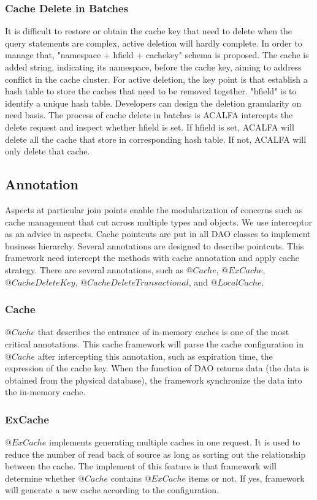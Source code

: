 \documentclass{singlecol-new}
\theoremstyle{TH}{
\newtheorem{lemma}{Lemma}
\newtheorem{theorem}[lemma]{Theorem}
\newtheorem{corrolary}[lemma]{Corrolary}
\newtheorem{conjecture}[lemma]{Conjecture}
\newtheorem{proposition}[lemma]{Proposition}
\newtheorem{claim}[lemma]{Claim}
\newtheorem{stheorem}[lemma]{Wrong Theorem}
}
\theoremstyle{THrm}{
\newtheorem{definition}{Definition}[section]
\newtheorem{question}{Question}[section]
\newtheorem{remark}{Remark}
\newtheorem{scheme}{Scheme}
}
\theoremstyle{THhit}{
\newtheorem{case}{Case}[section]
}
\begin{document}
\subsubsection{Cache Delete in Batches}
It is difficult to restore or obtain the cache key that need to delete when the query statements are complex, active deletion will hardly complete. In order to manage that, "namespace + hfield + cachekey" schema is proposed. The cache is added string, indicating its namespace, before the cache key, aiming to address conflict in the cache cluster. For active deletion, the key point is that establish a hash table to store the caches that need to be removed together. "hfield" is to identify a unique hash table. Developers can design the deletion granularity on need basis. The process of cache delete in batches is ACALFA intercepts the delete request and inspect whether hfield is set. If hfield is set, ACALFA will delete all the cache that store in corresponding hash table. If not, ACALFA will only delete that cache.

\subsection{Annotation}
Aspects at particular join points enable the modularization of concerns such as cache management that cut across multiple types and objects. We use interceptor as an advice in aspects. Cache pointcuts are put in all DAO classes to implement business hierarchy. Several annotations are designed to describe pointcuts. This framework need intercept the methods with cache annotation and apply cache strategy. There are several annotations, such as $@Cache$, $@ExCache$, $@CacheDeleteKey$, $@CacheDeleteTransactional$, and $@LocalCache$.

\subsubsection{Cache}
$@Cache$ that describes the entrance of in-memory caches is one of the most critical annotations. This cache framework will parse the cache configuration in $@Cache$ after intercepting this annotation, such as expiration time, the expression of the cache key. When the function of DAO returns data (the data is obtained from the physical database), the framework synchronize the data into the in-memory cache.

\subsubsection{ExCache}
$@ExCache$ implements generating multiple caches in one request. It is used to reduce the number of read back of source as long as sorting out the relationship between the cache. The implement of this feature is that framework will determine whether $@Cache$ contains $@ExCache$ items or not. If yes, framework will generate a new cache according to the configuration.
\end{document}
